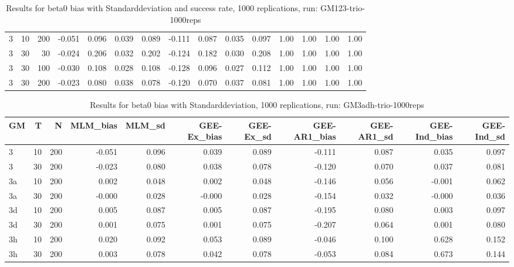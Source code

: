 \documentclass[
  12pt,
  a4paper,
]{article}
\begin{document}
\begin{table}[H]
\begin{tabular}{lrrrrrrrrrrrrrr}
  3 & 10 & 200 & -0.051 & 0.096 & 0.039 & 0.089 & -0.111 & 0.087 & 0.035 & 0.097 & 1.00 & 1.00 & 1.00 & 1.00 \\ 
  3 & 30 & 30 & -0.024 & 0.206 & 0.032 & 0.202 & -0.124 & 0.182 & 0.030 & 0.208 & 1.00 & 1.00 & 1.00 & 1.00 \\ 
  3 & 30 & 100 & -0.030 & 0.108 & 0.028 & 0.108 & -0.128 & 0.096 & 0.027 & 0.112 & 1.00 & 1.00 & 1.00 & 1.00 \\ 
  3 & 30 & 200 & -0.023 & 0.080 & 0.038 & 0.078 & -0.120 & 0.070 & 0.037 & 0.081 & 1.00 & 1.00 & 1.00 & 1.00 \\ 
   \hline
\end{tabular}
\caption{Results for beta0 bias with Standarddeviation and success rate, 1000 replications, run: GM123-trio-1000reps} 
\label{tab:beta0_bias_sd_success}
\end{table}

\begin{table}[H]
\centering
\begin{tabular}{lrrrrrrrrrr}
  \hline
GM & T & N & MLM\_bias & MLM\_sd & GEE-Ex\_bias & GEE-Ex\_sd & GEE-AR1\_bias & GEE-AR1\_sd & GEE-Ind\_bias & GEE-Ind\_sd \\ 
  \hline
3 & 10 & 200 & -0.051 & 0.096 & 0.039 & 0.089 & -0.111 & 0.087 & 0.035 & 0.097 \\ 
  3 & 30 & 200 & -0.023 & 0.080 & 0.038 & 0.078 & -0.120 & 0.070 & 0.037 & 0.081 \\ 
  3a & 10 & 200 & 0.002 & 0.048 & 0.002 & 0.048 & -0.146 & 0.056 & -0.001 & 0.062 \\ 
  3a & 30 & 200 & -0.000 & 0.028 & -0.000 & 0.028 & -0.154 & 0.032 & -0.000 & 0.036 \\ 
  3d & 10 & 200 & 0.005 & 0.087 & 0.005 & 0.087 & -0.195 & 0.080 & 0.003 & 0.097 \\ 
  3d & 30 & 200 & 0.001 & 0.075 & 0.001 & 0.075 & -0.207 & 0.064 & 0.001 & 0.080 \\ 
  3h & 10 & 200 & 0.020 & 0.092 & 0.053 & 0.089 & -0.046 & 0.100 & 0.628 & 0.152 \\ 
  3h & 30 & 200 & 0.003 & 0.078 & 0.042 & 0.078 & -0.053 & 0.084 & 0.673 & 0.144 \\ 
   \hline
\end{tabular}
\caption{Results for beta0 bias with Standarddeviation, 1000 replications, run: GM3adh-trio-1000reps} 
\label{tab:beta0_bias_sd}
\end{table}
\end{document}
